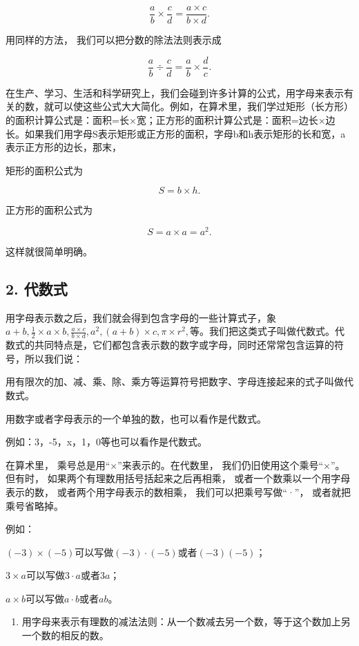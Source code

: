 \[
\frac{a}{b} \times \frac{c}{d} = \frac{a \times c}{b \times d}.
\]

用同样的方法， 我们可以把分数的除法法则表示成

\[
\frac{a}{b} \div \frac{c}{d} = \frac{a}{b} \times \frac{d}{c}.
\]

在生产、学习、生活和科学研究上，我们会碰到许多计算的公式，用字母来表示有关的数，就可以使这些公式大大简化。例如，在算术里，我们学过矩形（长方形）的面积计算公式是：面积=长×宽；正方形的面积计算公式是：面积=边长×边长。如果我们用字母S表示矩形或正方形的面积，字母b和h表示矩形的长和宽，a表示正方形的边长，那末，

矩形的面积公式为

\[
S = b \times h.
\]

正方形的面积公式为

\[
S = a \times a = a ^{2}.
\]

这样就很简单明确。

\subsection{2. 代数式}

用字母表示数之后，我们就会得到包含字母的一些计算式子，象\(a + b, \frac{1}{2} \times a \times b, \frac{a \times c}{b \times d}, a^2, (a + b) \times c, \pi \times r^2,\)等。我们把这类式子叫做代数式。代数式的共同特点是，它们都包含表示数的数字或字母，同时还常常包含运算的符号，所以我们说：

用有限次的加、减、乘、除、乘方等运算符号把数字、字母连接起来的式子叫做代数式。

用数字或者字母表示的一个单独的数，也可以看作是代数式。

例如：3，-5，x，1，0等也可以看作是代数式。

在算术里， 乘号总是用``×''来表示的。在代数里，
我们仍旧使用这个乘号``×''。但有时，
如果两个有理数用括号括起来之后再相乘，
或者一个数乘以一个用字母表示的数， 或者两个用字母表示的数相乘，
我们可以把乘号写做``·''， 或者就把乘号省略掉。

例如：

\((-3) \times (-5)\)可以写做\((-3) \cdot (-5)\)或者\((-3)(-5)\)；

\(3 \times a\)可以写做\(3 \cdot a\)或者\(3a\)；

\(a \times b\)可以写做\(a \cdot b\)或者\(ab\)。

\begin{enumerate}
\item
  用字母来表示有理数的减法法则：从一个数减去另一个数，等于这个数加上另一个数的相反的数。
\end{enumerate}

